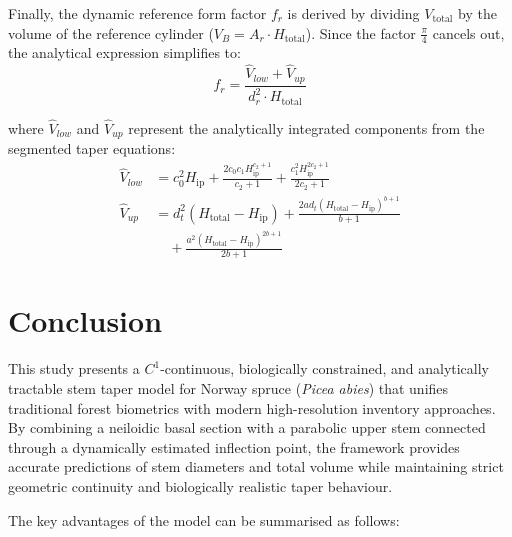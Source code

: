 \documentclass[twocolumn, bibliography=totoc]{scrartcl}
\begin{document}
Finally, the dynamic reference form factor $f_r$ is derived by dividing $V_{\text{total}}$ by the volume of the reference cylinder ($V_B = A_r \cdot H_{\text{total}}$). Since the factor $\frac{\pi}{4}$ cancels out, the analytical expression simplifies to:
\begin{equation}
f_r = \frac{\hat{V}_{low} + \hat{V}_{up}}{d_r^2 \cdot H_{\text{total}}}
\end{equation}

where $\hat{V}_{low}$ and $\hat{V}_{up}$ represent the analytically integrated components from the segmented taper equations:
\begin{align}
\hat{V}_{low} &= c_0^2 H_{\text{ip}} + \frac{2c_0 c_1 H_{\text{ip}}^{c_2+1}}{c_2+1} + \frac{c_1^2 H_{\text{ip}}^{2c_2+1}}{2c_2+1} \\
\hat{V}_{up} &= d_t^2 (H_{\text{total}} - H_{\text{ip}}) + \frac{2 a d_t (H_{\text{total}}-H_{\text{ip}})^{b+1}}{b+1} \nonumber \\
& \quad + \frac{a^2 (H_{\text{total}}-H_{\text{ip}})^{2b+1}}{2b+1}
\end{align}


\section{Conclusion}

This study presents a $C^1$-continuous, biologically constrained, and analytically tractable stem taper model for Norway spruce (\textit{Picea abies}) that unifies traditional forest biometrics with modern high-resolution inventory approaches. By combining a neiloidic basal section with a parabolic upper stem connected through a dynamically estimated inflection point, the framework provides accurate predictions of stem diameters and total volume while maintaining strict geometric continuity and biologically realistic taper behaviour.

The key advantages of the model can be summarised as follows:
\end{document}
